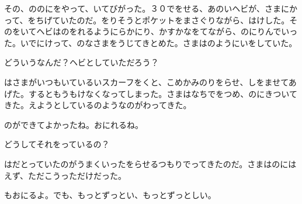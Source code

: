 その、ののにをやって、いてびがった。３０でをせる、あのいヘビが、さまにかって、をちげていたのだ。をりそうとポケットをまさぐりながら、はけした。そのをいてヘビはのをれるようにらかにり、かすかなをてながら、のにりんでいった。いでにけって、のなさまをうじてきとめた。さまはのようにいをしていた。

どういうなんだ？ヘビとしていただろう？

はさまがいつもいているいスカーフをくと、こめかみのりをらせ、しをませてあげた。するともうもけなくなってしまった。さまはなちでをつめ、のにきついてきた。えようとしているのようなのがわってきた。

のができてよかったね。おにれるね。

どうしてそれをっているの？

はだとっていたのがうまくいったをらせるつもりでってきたのだ。さまはのにはえず、ただこうっただけだった。

もおにるよ。でも、もっとずっとい、もっとずっとしい。

